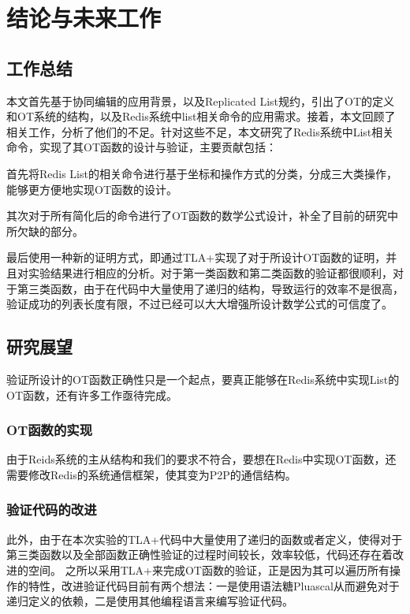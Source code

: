 \chapter{结论与未来工作}
\label{chapter:conclusion_future_work}
\section{工作总结}
\par 本文首先基于协同编辑的应用背景，以及Replicated List规约，引出了OT的定义和OT系统的结构，以及Redis系统中list相关命令的应用需求。接着，本文回顾了相关工作，分析了他们的不足。针对这些不足，本文研究了Redis系统中List相关命令，实现了其OT函数的设计与验证，主要贡献包括：
\par 首先将Redis List的相关命令进行基于坐标和操作方式的分类，分成三大类操作，能够更方便地实现OT函数的设计。
\par 其次对于所有简化后的命令进行了OT函数的数学公式设计，补全了目前的研究中所欠缺的部分。
\par 最后使用一种新的证明方式，即通过TLA+实现了对于所设计OT函数的证明，并且对实验结果进行相应的分析。对于第一类函数和第二类函数的验证都很顺利，对于第三类函数，由于在代码中大量使用了递归的结构，导致运行的效率不是很高，验证成功的列表长度有限，不过已经可以大大增强所设计数学公式的可信度了。
\section{研究展望}
验证所设计的OT函数正确性只是一个起点，要真正能够在Redis系统中实现List的OT函数，还有许多工作亟待完成。
\subsection{OT函数的实现}
由于Reids系统的主从结构和我们的要求不符合，要想在Redis中实现OT函数，还需要修改Redis的系统通信框架，使其变为P2P的通信结构。
\subsection{验证代码的改进}
此外，由于在本次实验的TLA+代码中大量使用了递归的函数或者定义，使得对于第三类函数以及全部函数正确性验证的过程时间较长，效率较低，代码还存在着改进的空间。
之所以采用TLA+来完成OT函数的验证，正是因为其可以遍历所有操作的特性，改进验证代码目前有两个想法：一是使用语法糖Pluascal从而避免对于递归定义的依赖，二是使用其他编程语言来编写验证代码。